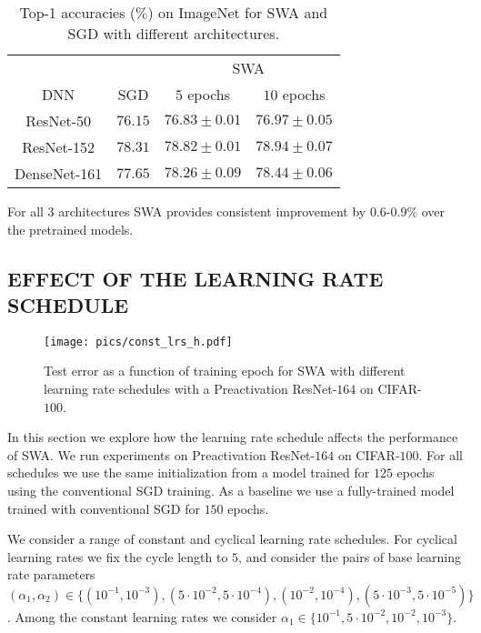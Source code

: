 \documentclass[letterpaper]{article}
\begin{document}
\begin{table}[!h]
	\caption{Top-1 accuracies ($\%$) on ImageNet for SWA and SGD with different 
		architectures.}
\label{table:imagenet_experiments}
\centering
\begin{tabular}{cccc}
	\toprule
  & & \multicolumn{2}{c}{SWA}	\\
	\cline{3-4}
	DNN & SGD & $5$ epochs& $10$ epochs \\
	\hline
	ResNet-50 & 
	$76.15$ & $76.83 \pm 0.01$ & $76.97 \pm 0.05$ \\
	ResNet-152 & 
	$78.31$ & $78.82 \pm 0.01$ & $78.94 \pm 0.07$ \\
	DenseNet-161 & 
	$77.65$ & $78.26 \pm 0.09$ & $78.44 \pm 0.06$ \\
	\bottomrule
\end{tabular}
\end{table}

For all $3$ architectures SWA provides consistent improvement by $0.6$-$0.9 \%$
over the pretrained models.

\subsection{EFFECT OF THE LEARNING RATE SCHEDULE}

\begin{figure}[!h]
	\centering
	\texttt{[image: pics/const\_lrs\_h.pdf]}
	\caption{
    Test error as a function of training epoch for SWA with different
    learning rate schedules with a Preactivation ResNet-$164$ on CIFAR-$100$.} 
  \label{fig:lr_dependence}
\end{figure}

In this section we explore how the learning rate schedule affects the 
performance of SWA. We run experiments on Preactivation ResNet-$164$ 
on CIFAR-$100$. For all schedules we use the same initialization from
a model trained for $125$ epochs using the conventional SGD training.
As a baseline we use a fully-trained model trained with conventional
SGD for $150$ epochs.

We consider a range of constant and cyclical learning rate schedules. 
For cyclical learning rates we fix the cycle length to $5$, and consider 
the pairs of base learning rate parameters $(\alpha_1, \alpha_2) \in 
\{(10^{-1}, 10^{-3}), (5 \cdot 10^{-2}, 5 \cdot 10^{-4}), (10^{-2}, 10^{-4}),
(5 \cdot 10^{-3}, 5 \cdot 10^{-5})
\}$. Among the constant learning rates we consider
$\alpha_1 \in \{10^{-1}, 5 \cdot 10^{-2}, 10^{-2}, 10^{-3}\}$. 
\end{document}
